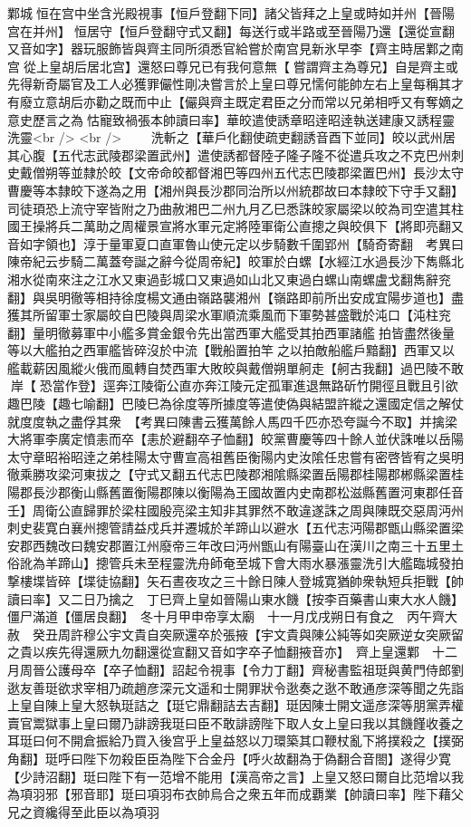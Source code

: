 鄴城恒在宫中坐含光殿視事【恒戶登翻下同】諸父皆拜之上皇或時如并州【晉陽宫在并州】恒居守【恒戶登翻守式又翻】每送行或半路或至晉陽乃還【還從宣翻又音如字】器玩服飾皆與齊主同所須悉官給嘗於南宫見新氷早李【齊主時居鄴之南宫從上皇胡后居北宫】還怒曰尊兄已有我何意無【嘗謂齊主為尊兄】自是齊主或先得新奇屬官及工人必獲罪儼性剛决嘗言於上皇曰尊兄懦何能帥左右上皇每稱其才有廢立意胡后亦勸之既而中止【儼與齊主既定君臣之分而常以兄弟相呼又有奪嫡之意史歷言之為怙寵致禍張本帥讀曰率】華皎遣使誘章昭逹昭逹執送建康又誘程靈洗靈<br />
<br />
　　洗斬之【華戶化翻使疏吏翻誘音酉下並同】皎以武州居其心腹【五代志武陵郡梁置武州】遣使誘都督陸子隆子隆不從遣兵攻之不克巴州刺史戴僧朔等並隸於皎【文帝命皎都督湘巴等四州五代志巴陵郡梁置巴州】長沙太守曹慶等本隸皎下遂為之用【湘州與長沙郡同治所以州統郡故曰本隸皎下守手又翻】司徒頊恐上流守宰皆附之乃曲赦湘巴二州九月乙巳悉誅皎家屬梁以皎為司空遣其柱國王操將兵二萬助之周權景宣將水軍元定將陸軍衛公直摠之與皎俱下【將即亮翻又音如字領也】淳于量軍夏口直軍魯山使元定以步騎數千圍郢州【騎奇寄翻　考異曰陳帝紀云步騎二萬蓋夸誕之辭今從周帝紀】皎軍於白螺【水經江水過長沙下雋縣北湘水從南來注之江水又東過彭城口又東過如山北又東過白螺山南螺盧戈翻雋辭兖翻】與吳明徹等相持徐度楊文通由嶺路襲湘州【嶺路即前所出安成宜陽步道也】盡獲其所留軍士家屬皎自巴陵與周梁水軍順流乘風而下軍勢甚盛戰於沌口【沌柱兖翻】量明徹募軍中小艦多賞金銀令先出當西軍大艦受其拍西軍諸艦拍皆盡然後量等以大艦拍之西軍艦皆碎沒於中流【戰船置拍竿之以拍敵船艦戶黯翻】西軍又以艦載薪因風縱火俄而風轉自焚西軍大敗皎與戴僧朔單舸走【舸古我翻】過巴陵不敢岸【恐當作登】逕奔江陵衛公直亦奔江陵元定孤軍進退無路斫竹開徑且戰且引欲趣巴陵【趣七喻翻】巴陵巳為徐度等所據度等遣使偽與結盟許縱之還國定信之解仗就度度執之盡俘其衆　【考異曰陳書云獲萬餘人馬四千匹亦恐夸誕今不取】并擒梁大將軍李廣定憤恚而卒【恚於避翻卒子恤翻】皎黨曹慶等四十餘人並伏誅唯以岳陽太守章昭裕昭逹之弟桂陽太守曹宣高祖舊臣衡陽内史汝隂任忠嘗有密啓皆宥之吳明徹乘勝攻梁河東拔之【守式又翻五代志巴陵郡湘隂縣梁置岳陽郡桂陽郡郴縣梁置桂陽郡長沙郡衡山縣舊置衡陽郡陳以衡陽為王國故置内史南郡松滋縣舊置河東郡任音壬】周衛公直歸罪於梁柱國殷亮梁主知非其罪然不敢違遂誅之周與陳既交惡周沔州刺史裴寛白襄州摠管請益戍兵并遷城於羊蹄山以避水【五代志沔陽郡甑山縣梁置梁安郡西魏改曰魏安郡置江州廢帝三年改曰沔州甑山有陽臺山在漢川之南三十五里土俗訛為羊蹄山】摠管兵未至程靈洗舟師奄至城下會大雨水暴漲靈洗引大艦臨城發拍撃樓堞皆碎【堞徒協翻】矢石晝夜攻之三十餘日陳人登城寛猶帥衆執短兵拒戰【帥讀曰率】又二日乃擒之　丁巳齊上皇如晉陽山東水饑【按李百藥書山東大水人饑】僵尸滿道【僵居良翻】　冬十月甲申帝享太廟　十一月戊戌朔日有食之　丙午齊大赦　癸丑周許穆公宇文貴自突厥還卒於張掖【宇文貴與陳公純等如突厥逆女突厥留之貴以疾先得還厥九勿翻還從宣翻又音如字卒子恤翻掖音亦】　齊上皇還鄴　十二月周晉公護母卒【卒子恤翻】詔起令視事【令力丁翻】齊秘書監祖珽與黄門侍郎劉逖友善珽欲求宰相乃疏趙彦深元文遥和士開罪狀令逖奏之逖不敢通彦深等聞之先詣上皇自陳上皇大怒執珽詰之【珽它鼎翻詰去吉翻】珽因陳士開文遥彦深等朋黨弄權賣官鬻獄事上皇曰爾乃誹謗我珽曰臣不敢誹謗陛下取人女上皇曰我以其饑饉收養之耳珽曰何不開倉振給乃買入後宫乎上皇益怒以刀環築其口鞭杖亂下將撲殺之【撲弼角翻】珽呼曰陛下勿殺臣臣為陛下合金丹【呼火故翻為于偽翻合音閤】遂得少寛【少詩沼翻】珽曰陛下有一范增不能用【漢高帝之言】上皇又怒曰爾自比范增以我為項羽邪【邪音耶】珽曰項羽布衣帥烏合之衆五年而成覇業【帥讀曰率】陛下藉父兄之資纔得至此臣以為項羽